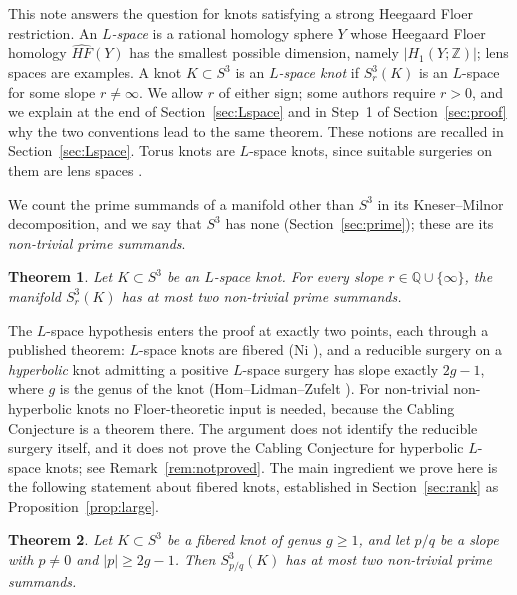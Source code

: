 \documentclass[12pt]{article}
\newcommand{\Z}{\mathbb Z}
\newcommand{\Q}{\mathbb Q}
\newcommand{\Surg}[2]{S^3_{#1}(#2)}
\newcommand{\HFhat}{\widehat{HF}}
\newtheorem{theorem}{Theorem}[section]
\theoremstyle{definition}
\theoremstyle{remark}
\begin{document}
This note answers the question for knots satisfying a strong
Heegaard Floer restriction. An \emph{\(L\)-space} is a rational homology
sphere \(Y\) whose Heegaard Floer homology \(\HFhat(Y)\) has the smallest
possible dimension, namely \(|H_1(Y;\Z)|\); lens spaces are examples. A knot
\(K\subset S^3\) is an \emph{\(L\)-space knot} if \(\Surg{r}{K}\) is an
\(L\)-space for some slope \(r\neq\infty\). We allow \(r\) of either sign;
some authors require \(r>0\), and we explain at the end of
Section~\ref{sec:Lspace} and in Step~1 of Section~\ref{sec:proof} why the
two conventions lead to the same theorem. These notions are recalled in
Section~\ref{sec:Lspace}. Torus knots are \(L\)-space knots, since
suitable surgeries on them are lens spaces \cite{Moser1971}.

We count the prime summands of a manifold other than \(S^3\) in its
Kneser--Milnor decomposition, and we say that \(S^3\) has none
(Section~\ref{sec:prime}); these are its \emph{non-trivial prime
summands}.

\begin{theorem}\label{thm:main}
Let \(K\subset S^3\) be an \(L\)-space knot. For every slope
\(r\in\Q\cup\{\infty\}\), the manifold \(\Surg{r}{K}\) has at most two
non-trivial prime summands.
\end{theorem}

The \(L\)-space hypothesis enters the proof at exactly two points, each
through a published theorem: \(L\)-space knots are fibered (Ni
\cite{Ni2007}), and a reducible surgery on a \emph{hyperbolic} knot
admitting a positive \(L\)-space surgery has slope exactly \(2g-1\), where
\(g\) is the genus of the knot (Hom--Lidman--Zufelt \cite[Theorem~1.3]{HLZ2015}).
For non-trivial non-hyperbolic knots no Floer-theoretic input is needed,
because the Cabling Conjecture is a theorem there. The argument does not identify
the reducible surgery itself, and it does not prove the Cabling
Conjecture for hyperbolic \(L\)-space knots; see Remark~\ref{rem:notproved}.
The main ingredient we prove here is the following statement about
fibered knots, established in Section~\ref{sec:rank} as
Proposition~\ref{prop:large}.

\begin{theorem}\label{thm:fibered}
Let \(K\subset S^3\) be a fibered knot of genus \(g\geq1\), and let
\(p/q\) be a slope with \(p\neq0\) and \(|p|\geq 2g-1\). Then
\(\Surg{p/q}{K}\) has at most two non-trivial prime summands.
\end{theorem}
\end{document}
